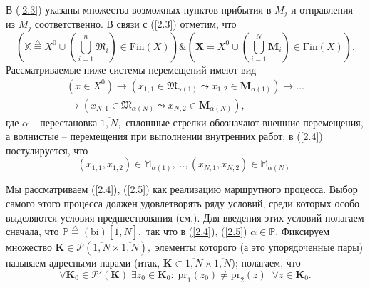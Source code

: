 \documentclass[10pt]{SPIIRAS_Proceedings}
\begin{document}
В (\ref{2.3}) указаны множества возможных пунктов прибытия в $M_j$
и отправления из $M_j$ соответственно.
В связи с (\ref{2.3})
отметим, что
$$
(\mathbb{X} \stackrel{\triangle}{=} X^0 \cup
(\bigcup\limits_{i=1}^n \mathfrak{M}_i) \in \mathrm{Fin}(X))
\& (\mathbf{X} = X^0 \cup (\bigcup\limits_{i=1}^N \mathbf{M}_i) \in \mathrm{Fin}(X)).
$$
Рассматриваемые ниже системы перемещений имеют вид
\begin{equation}\label{2.4}
  \begin{aligned}
    (x \in X^0)
    \to
    (x_{1,1} \in \mathfrak{M}_{\alpha(1)} \leadsto x_{1,2} \in \mathbf{M}_{\alpha(1)})
    \to \dots \\
    \to
    (x_{N,1} \in \mathfrak{M}_{\alpha(N)} \leadsto x_{N,2} \in \mathbf{M}_{\alpha(N)}),
  \end{aligned}
\end{equation}
где $\alpha$ -- перестановка $\overline{1,N},$
сплошные стрелки обозначают внешние перемещения,
а волнистые -- перемещения при выполнении внутренних работ;
в (\ref{2.4}) постулируется, что
\begin{equation}\label{2.5}
  (x_{1,1},x_{1,2}) \in \mathbb{M}_{\alpha(1)},
  \dots,
  (x_{N,1},x_{N,2}) \in \mathbb{M}_{\alpha(N)}.
\end{equation}

Мы рассматриваем (\ref{2.4}), (\ref{2.5})
как реализацию маршрутного процесса.
Выбор самого этого процесса должен удовлетворять
ряду условий,
среди которых особо выделяются условия предшествования (см.\cite{10}).
Для введения этих условий полагаем сначала,
что $\mathbb{P} \stackrel{\triangle}{=} (
  \mathrm{bi})[\overline{1,N}],$
так что в (\ref{2.4}), (\ref{2.5})
$\alpha \in \mathbb{P}.$
Фиксируем множество
$\mathbf{K} \in \mathcal{P}(\overline{1,N} \times \overline{1,N}),$
элементы которого
(а это упорядоченные пары)
называем адресными парами
(итак, $\mathbf{K} \subset \overline{1,N} \times \overline{1,N}$);
полагаем, что
\begin{equation}\label{2.6}
\forall{\mathbf{K}_0} \in \mathcal{P}'(\mathbf{K})\;\exists{z_0} \in \mathbf{K}_0:\;\mathrm{pr}_1(z_0)
\ne \mathrm{pr}_2(z)\;\;\forall{z} \in \mathbf{K}_0.
\end{equation}
\end{document}
